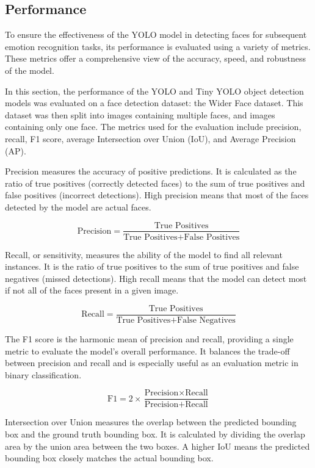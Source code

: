 \subsection{Performance}

To ensure the effectiveness of the YOLO model in detecting faces for subsequent emotion recognition tasks, its performance is evaluated using a variety of metrics. These metrics offer a comprehensive view of the accuracy, speed, and robustness of the model.

In this section, the performance of the YOLO and Tiny YOLO object detection models was evaluated on a face detection dataset: the Wider Face dataset. This dataset was then split into images containing multiple faces, and images containing only one face. The metrics used for the evaluation include precision, recall, F1 score, average Intersection over Union (IoU), and Average Precision (AP).

Precision measures the accuracy of positive predictions. It is calculated as the ratio of true positives (correctly detected faces) to the sum of true positives and false positives (incorrect detections). High precision means that most of the faces detected by the model are actual faces.

\[
\text{Precision} = \frac{\text{True Positives}}{\text{True Positives} + \text{False Positives}}
\]

Recall, or sensitivity, measures the ability of the model to find all relevant instances. It is the ratio of true positives to the sum of true positives and false negatives (missed detections). High recall means that the model can detect most if not all of the faces present in a given image.

\[
\text{Recall} = \frac{\text{True Positives}}{\text{True Positives} + \text{False Negatives}}
\]

The F1 score is the harmonic mean of precision and recall, providing a single metric to evaluate the model's overall performance. It balances the trade-off between precision and recall and is especially useful as an evaluation metric in binary classification.

\[
\text{F1} = 2 \times \frac{\text{Precision} \times \text{Recall}}{\text{Precision} + \text{Recall}}
\]

Intersection over Union measures the overlap between the predicted bounding box and the ground truth bounding box. It is calculated by dividing the overlap area by the union area between the two boxes. A higher IoU means the predicted bounding box closely matches the actual bounding box.

